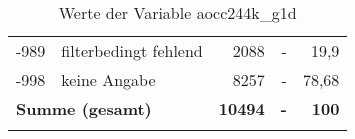 \begin{longtable}{Xlrrr}
       -989 & filterbedingt fehlend & 2088 & - & 19,9 \\

       -998 & keine Angabe & 8257 & - & 78,68 \\

     \midrule
     \multicolumn{2}{l}{\textbf{Summe (gesamt)}} & \textbf{10494} & \textbf{-} & \textbf{100} \\
     \bottomrule
     \caption{Werte der Variable aocc244k\_g1d}
     \end{longtable}
     
